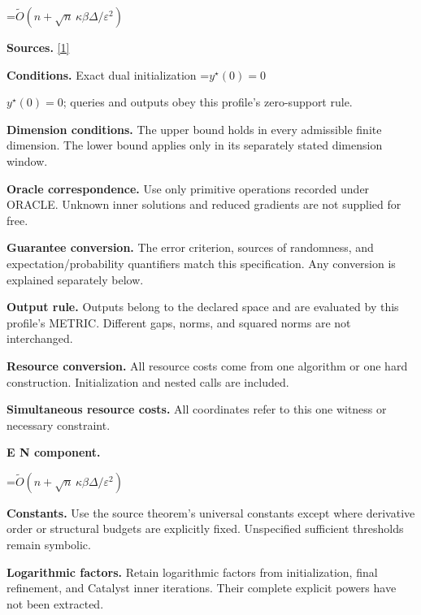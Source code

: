 \documentclass[10pt,a4paper]{article}
\newcommand{\AtlasMath}[1]{\par\begingroup\centering\setbox0=\hbox{$\displaystyle #1$}\ifdim\wd0>1.4\linewidth\typeout{ATLAS WIDE FORMULA: \the\wd0}\fi\ifdim\wd0>\linewidth\resizebox{\linewidth}{!}{\box0}\else\box0\fi\par\endgroup}
\newcommand{\AtlasInlineMath}[1]{\begingroup\setbox0=\hbox{$#1$}\ifdim\wd0>.4\linewidth\endgroup\AtlasMath{#1}\else\endgroup$#1$\fi}
\begin{document}
\AtlasMath{\widetilde{O}(n+\sqrt n\,\kappa\beta\Delta/\varepsilon^2)}


\textbf{Sources.} \href{https://arxiv.org/pdf/2610.04944v1}{[1]}



\textbf{Conditions.} Exact dual initialization \AtlasInlineMath{y^\star(0)=0}; queries and outputs obey this profile's zero-support rule.



\textbf{Dimension conditions.} The upper bound holds in every admissible finite dimension. The lower bound applies only in its separately stated dimension window.



\textbf{Oracle correspondence.} Use only primitive operations recorded under ORACLE. Unknown inner solutions and reduced gradients are not supplied for free.



\textbf{Guarantee conversion.} The error criterion, sources of randomness, and expectation/probability quantifiers match this specification. Any conversion is explained separately below.



\textbf{Output rule.} Outputs belong to the declared space and are evaluated by this profile's METRIC. Different gaps, norms, and squared norms are not interchanged.



\textbf{Resource conversion.} All resource costs come from one algorithm or one hard construction. Initialization and nested calls are included.



\textbf{Simultaneous resource costs.} All coordinates refer to this one witness or necessary constraint.



\textbf{E N component.}



\AtlasMath{\widetilde O(n+\sqrt n\,\kappa\beta\Delta/\varepsilon^2)}


\textbf{Constants.} Use the source theorem’s universal constants except where derivative order or structural budgets are explicitly fixed. Unspecified sufficient thresholds remain symbolic.



\textbf{Logarithmic factors.} Retain logarithmic factors from initialization, final refinement, and Catalyst inner iterations. Their complete explicit powers have not been extracted.
\end{document}
